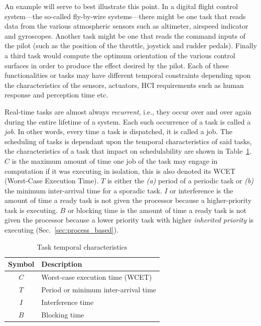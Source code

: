 An example will serve to best illustrate this point. In a digital
flight control system---the so-called fly-by-wire systems---there
might be one task that reads data from the various atmospheric sensors
such as altimeter, airspeed indicator and gyroscopes. Another task
might be one that reads the command inputs of the pilot (such as the
position of the throttle, joystick and rudder pedals). Finally a third
task would compute the optimum orientation of the various control
surfaces in order to produce the effect desired by the pilot. Each of
these functionalities or tasks may have different temporal constraints
depending upon the characteristics of the sensors, actuators, HCI
requirements such as human response and perception time etc.

Real-time tasks are almost always \emph{recurrent}, i.e., they occur
over and over again during the entire lifetime of a system. Each such
occurrence of a task is called a \emph{job}. In other words, every
time a task is dispatched, it is called a job. The scheduling of tasks
is dependant upon the temporal characteristics of said tasks, the
characteristics of a task that impact on schedulability are shown in
Table~\ref{tab:task_chars}. $C$ is the maximum amount of time one job
of the task may engage in computation if it was executing in
isolation, this is also denoted its WCET (Worst-Case Execution
Time). $T$ is either the \emph{(a)} period of a periodic task or
\emph{(b)} the minimum inter-arrival time for a sporadic task. $I$ or
interference is the amount of time a ready task is not given the
processor because a higher-priority task is executing. $B$ or blocking
time is the amount of time a ready task is not given the processor
because a lower priority task with higher \emph{inherited priority} is
executing (Sec.~\ref{sec:process_based}).

\begin{table}
\centering
\begin{tabular}{|c|l|}
\hline
\textbf{Symbol} & \textbf{Description}\\
\hline
$C$ & Worst-case execution time (WCET)\\
$T$ & Period or minimum inter-arrival time\\
$I$ & Interference time\\
$B$ & Blocking time\\
\hline
\end{tabular}
\caption{Task temporal characteristics}
\label{tab:task_chars}
\end{table}

